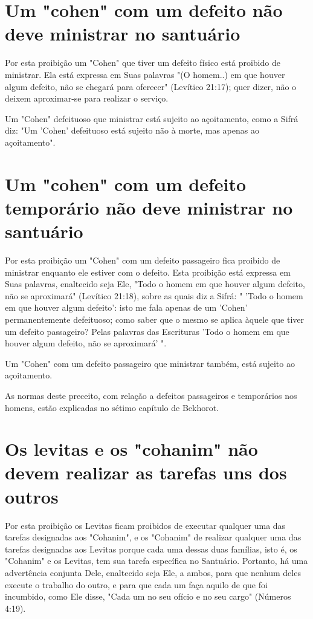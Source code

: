 \begin{itemize}
\begin{enumrate}
\begin{itemize}
\begin{itemize}
\begin{itemize}
\section{Um "cohen" com um defeito não deve ministrar no santuário}

Por esta proibição um "Cohen" que tiver um defeito físico está proi­bido
de ministrar. Ela está expressa em Suas palavras "(O homem..) em que
hou­ver algum defeito, não se chegará para oferecer" (Levítico 21:17);
quer dizer, não o deixem aproximar-se para realizar o serviço.

Um "Cohen" defeituoso que ministrar está sujeito ao açoitamento, como a
Sifrá diz: "Um 'Cohen' defeituoso está sujeito não à morte, mas apenas
ao açoitamento".

\section{Um "cohen" com um defeito temporário não deve ministrar no santuário}

Por esta proibição um "Cohen" com um defeito passageiro fica proi­bido
de ministrar enquanto ele estiver com o defeito. Esta proibição está
expressa em Suas palavras, enaltecido seja Ele, "Todo o homem em que
houver algum defeito, não se aproximará" (Levítico 21:18), sobre as
quais diz a Sifrá: " 'Todo o homem em que houver algum defeito': isto me
fala apenas de um 'Cohen'
permanentemente defeituoso; como saber que o mesmo se aplica àquele que
tiver um defeito passageiro? Pelas palavras das Escrituras 'Todo o homem
em que houver algum defeito, não se aproximará' ".

Um "Cohen" com um defeito passageiro que ministrar também, es­tá sujeito
ao açoitamento.

As normas deste preceito, com relação a defeitos passageiros e
tem­porários nos homens, estão explicadas no sétimo capítulo de
Bekhorot.

\section{Os levitas e os "cohanim" não devem realizar as tarefas uns dos outros}

Por esta proibição os Levitas ficam proibidos de executar qualquer uma
das tarefas designadas aos "Cohanim", e os "Cohanim" de realizar
qual­quer uma das tarefas designadas aos Levitas porque cada uma dessas
duas famí­lias, isto é, os "Cohanim" e os Levitas, tem sua tarefa
específica no Santuário. Portanto, há uma advertência conjunta Dele,
enaltecido seja Ele, a ambos, para que nenhum deles execute o trabalho
do outro, e para que cada um faça aquilo de que foi incumbido, como Ele
disse, "Cada um no seu ofício e no seu cargo" (Números 4:19).


\end{itemize}
\end{itemize}
\end{itemize}
\end{enumrate}
\end{itemize}
